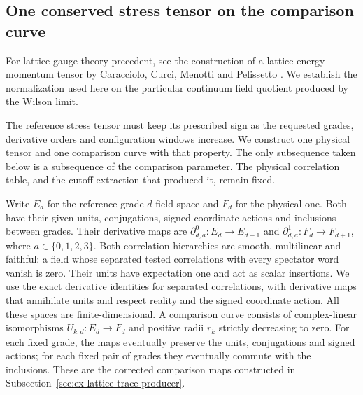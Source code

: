 \subsection{One conserved stress tensor on the comparison curve}
\label{sec:actual-stress-normalization}

For lattice gauge theory precedent, see the construction of a lattice
energy--momentum tensor by Caracciolo, Curci, Menotti and Pelissetto
\cite{CaraccioloEtAl90}. We establish the normalization used here on the
particular continuum field quotient produced by the Wilson limit.


The reference stress tensor must keep its prescribed sign as the requested
grades, derivative orders and configuration windows increase. We construct
one physical tensor and one comparison curve with that property. The only
subsequence taken below is a subsequence of the comparison parameter. The
physical correlation table, and the cutoff extraction that produced it,
remain fixed.

Write $E_d$ for the reference grade-$d$ field space and $F_d$ for the
physical one. Both have their given units, conjugations, signed coordinate
actions and inclusions between grades. Their derivative maps are
$\partial^0_{d,a}:E_d\to E_{d+1}$ and
$\partial^1_{d,a}:F_d\to F_{d+1}$, where $a\in\{0,1,2,3\}$.
Both correlation hierarchies are smooth, multilinear and faithful: a field
whose separated tested correlations with every spectator word vanish is
zero. Their units have expectation one and act as scalar insertions.
We use the exact derivative identities for separated correlations, with
derivative maps that annihilate units and respect reality and the signed
coordinate action. All these spaces are finite-dimensional. A comparison curve consists of
complex-linear isomorphisms $U_{k,d}:E_d\to F_d$ and positive radii
$r_k$ strictly decreasing to zero. For each fixed grade, the maps
eventually preserve the units, conjugations and signed actions; for
each fixed pair of grades they eventually commute with the inclusions.
These are the corrected comparison maps constructed in
Subsection~\ref{sec:ex-lattice-trace-producer}.

